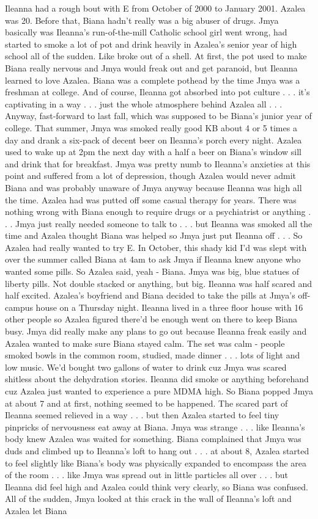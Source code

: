 \documentclass[12pt]{book}
\begin{document}
Ileanna had a rough bout with E from October of 2000 to January 2001. Azalea was 20. Before that, Biana hadn't really was a big abuser of drugs. Jmya basically was Ileanna's run-of-the-mill Catholic school girl went wrong, had started to smoke a lot of pot and drink heavily in Azalea's senior year of high school all of the sudden. Like broke out of a shell. At first, the pot used to make Biana really nervous and Jmya would freak out and get paranoid, but Ileanna learned to love Azalea. Biana was a complete pothead by the time Jmya was a freshman at college. And of course, Ileanna got absorbed into pot culture . . .  it's captivating in a way . . .  just the whole atmosphere behind Azalea all . . .  Anyway, fast-forward to last fall, which was supposed to be Biana's junior year of college. That summer, Jmya was smoked really good KB about 4 or 5 times a day and drank a six-pack of decent beer on Ileanna's porch every night. Azalea used to wake up at 2pm the next day with a half a beer on Biana's window sill and drink that for breakfast. Jmya was pretty numb to Ileanna's anxieties at this point and suffered from a lot of depression, though Azalea would never admit Biana and was probably unaware of Jmya anyway because Ileanna was high all the time. Azalea had was putted off some casual therapy for years. There was nothing wrong with Biana enough to require drugs or a psychiatrist or anything . . .  Jmya just really needed someone to talk to . . .  but Ileanna was smoked all the time and Azalea thought Biana was helped so Jmya just put Ileanna off . . .  So Azalea had really wanted to try E. In October, this shady kid I'd was slept with over the summer called Biana at 4am to ask Jmya if Ileanna knew anyone who wanted some pills. So Azalea said, yeah - Biana. Jmya was big, blue statues of liberty pills. Not double stacked or anything, but big. Ileanna was half scared and half excited. Azalea's boyfriend and Biana decided to take the pills at Jmya's off-campus house on a Thursday night. Ileanna lived in a three floor house with 16 other people so Azalea figured there'd be enough went on there to keep Biana busy. Jmya did really make any plans to go out because Ileanna freak easily and Azalea wanted to make sure Biana stayed calm. The set was calm - people smoked bowls in the common room, studied, made dinner . . .  lots of light and low music. We'd bought two gallons of water to drink cuz Jmya was scared shitless about the dehydration stories. Ileanna did smoke or anything beforehand cuz Azalea just wanted to experience a pure MDMA high. So Biana popped Jmya at about 7 and at first, nothing seemed to be happened. The scared part of Ileanna seemed relieved in a way . . .  but then Azalea started to feel tiny pinpricks of nervousness eat away at Biana. Jmya was strange . . .  like Ileanna's body knew Azalea was waited for something. Biana complained that Jmya was duds and climbed up to Ileanna's loft to hang out . . .  at about 8, Azalea started to feel slightly like Biana's body was physically expanded to encompass the area of the room . . .  like Jmya was spread out in little particles all over . . .  but Ileanna did feel high and Azalea could think very clearly, so Biana was confused. All of the sudden, Jmya looked at this crack in the wall of Ileanna's loft and Azalea let Biana 
\end{document}
